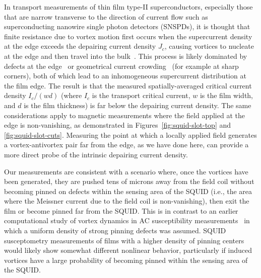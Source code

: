 \documentclass[%
 reprint,
 superscriptaddress,
 amsmath,
 amssymb,
 amsfonts,
 aps,
 prb,
]{revtex4-2}
\begin{document}
In transport measurements of thin film type-II superconductors, especially those that are narrow transverse to the direction of current flow such as superconducting nanowire single photon detectors (SNSPDs), it is thought that finite resistance due to vortex motion first occurs when the supercurrent density at the edge exceeds the depairing current density $J_c$, causing vortices to nucleate at the edge and then travel into the bulk~\cite{Vodolazov2003-ya}. This process is likely dominated by defects at the edge~\cite{Cerbu2013-hr, Benfenati2020-mg, Bezuglyj2022-cm} or geometrical current crowding~\cite{Clem2011-ji, Clem2012-og, Berdiyorov2012-rn, Hortensius2012-op, Henrich2012-jm, Adami2013-ci, Ilin2014-od, Jonsson2022-mb} (for example at sharp corners), both of which lead to an inhomogeneous supercurrent distribution at the film edge. The result is that the measured spatially-averaged critical current density $I_c/(wd)$ (where $I_c$ is the transport critical current, $w$ is the film width, and $d$ is the film thickness) is far below the depairing current density. The same considerations apply to magnetic measurements where the field applied at the edge is non-vanishing, as demonstrated in Figures~\ref{fig:squid-slot-top} and \ref{fig:squid-slot-cuts}. Measuring the point at which a locally applied field generates a vortex-antivortex pair far from the edge, as we have done here, can provide a more direct probe of the intrinsic depairing current density.

Our measurements are consistent with a scenario where, once the vortices have been generated, they are pushed tens of microns away from the field coil without becoming pinned on defects within the sensing area of the SQUID (i.e., the area where the Meissner current due to the field coil is non-vanishing), then exit the film or become pinned far from the SQUID. This is in contrast to an earlier computational study of vortex dynamics in AC susceptibility measurements~\cite{Lemberger2016-pb} in which a uniform density of strong pinning defects was assumed. SQUID susceptometry measurements of films with a higher density of pinning centers would likely show somewhat different nonlinear behavior, particularly if induced vortices have a large probability of becoming pinned within the sensing area of the SQUID.
\end{document}
